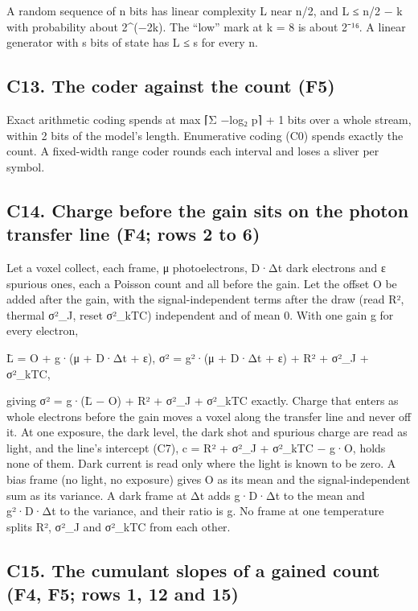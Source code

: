 A random sequence of n bits has linear complexity L near n/2, and L ≤ n/2 − k with probability about 2\textasciicircum{}(−2k). The “low” mark at k = 8 is about 2⁻¹⁶. A linear generator with s bits of state has L ≤ s for every n.

\subsection{\texorpdfstring{C13. The coder against the count (F5)}{C13. The coder against the count (F5)}}

Exact arithmetic coding spends at max ⌈Σ −log₂ p⌉ + 1 bits over a whole stream, within 2 bits of the model's length. Enumerative coding (C0) spends exactly the count. A fixed-width range coder rounds each interval and loses a sliver per symbol.

\subsection{\texorpdfstring{C14. Charge before the gain sits on the photon transfer line (F4; rows 2 to 6)}{C14. Charge before the gain sits on the photon transfer line (F4; rows 2 to 6)}}

Let a voxel collect, each frame, μ photoelectrons, D·Δt dark electrons and ε spurious ones, each a Poisson count and all before the gain. Let the offset O be added after the gain, with the signal-independent terms after the draw (read R², thermal σ²\_\allowbreak{}J, reset σ²\_\allowbreak{}kTC) independent and of mean 0. With one gain g for every electron,

L̄ = O + g·(μ + D·Δt + ε),  σ² = g²·(μ + D·Δt + ε) + R² + σ²\_\allowbreak{}J + σ²\_\allowbreak{}kTC,

giving σ² = g·(L̄ − O) + R² + σ²\_\allowbreak{}J + σ²\_\allowbreak{}kTC exactly. Charge that enters as whole electrons before the gain moves a voxel along the transfer line and never off it. At one exposure, the dark level, the dark shot and spurious charge are read as light, and the line's intercept (C7), c = R² + σ²\_\allowbreak{}J + σ²\_\allowbreak{}kTC − g·O, holds none of them. Dark current is read only where the light is known to be zero. A bias frame (no light, no exposure) gives O as its mean and the signal-independent sum as its variance. A dark frame at Δt adds g·D·Δt to the mean and g²·D·Δt to the variance, and their ratio is g. No frame at one temperature splits R², σ²\_\allowbreak{}J and σ²\_\allowbreak{}kTC from each other.

\subsection{\texorpdfstring{C15. The cumulant slopes of a gained count (F4, F5; rows 1, 12 and 15)}{C15. The cumulant slopes of a gained count (F4, F5; rows 1, 12 and 15)}}

